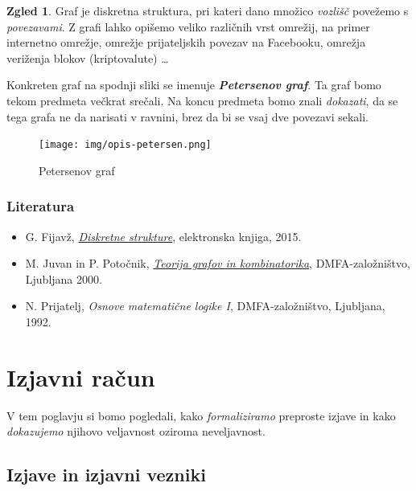 \documentclass[11pt]{book}
\def\definicija{\color{rdeca}\bf\em}
\def\literatura{\color{modra}}
\theoremstyle{definition}
\theoremstyle{zgled}
\newtheorem*{zgled}{Zgled}
\theoremstyle{odprtproblem}
\theoremstyle{domacanaloga}
\theoremstyle{izrek}
\begin{document}
\begin{zgled}
Graf je diskretna struktura, pri kateri dano množico \emph{vozlišč} povežemo s \emph{povezavami}. Z grafi lahko opišemo veliko različnih vrst omrežij, na primer internetno omrežje, omrežje prijateljskih povezav na Facebooku, omrežja veriženja blokov (kriptovalute) \dots 

Konkreten graf na spodnji sliki se imenuje {\definicija Petersenov graf}. Ta graf bomo tekom predmeta večkrat srečali. Na koncu predmeta bomo znali \emph{dokazati}, da se tega grafa ne da narisati v ravnini, brez da bi se vsaj dve povezavi sekali.

\begin{figure}[h]
    \centering
    \texttt{[image: img/opis-petersen.png]}
    \caption{Petersenov graf}
\end{figure}
\end{zgled}

\newpage

\subsection*{Literatura}

\begin{itemize}
\item {\literatura G. Fijavž, \href{http://matematika.fri.uni-lj.si/ds/ds.pdf}{\emph{Diskretne strukture}}, elektronska knjiga, 2015.} 
\item {\literatura M. Juvan in P. Potočnik, \href{http://www.dmfa-zaloznistvo.si/ipmr/1662.htm}{\emph{Teorija grafov in kombinatorika}}, DMFA-založništvo, Ljubljana 2000.}
\item {\literatura N. Prijatelj, \emph{Osnove matematične logike I}, DMFA-založništvo, Ljubljana, 1992.}
\end{itemize}


\chapter{Izjavni račun}

V tem poglavju si bomo pogledali, kako \emph{formaliziramo} preproste izjave in kako \emph{dokazujemo} njihovo veljavnost oziroma neveljavnost.

\section{Izjave in izjavni vezniki}
\end{document}

